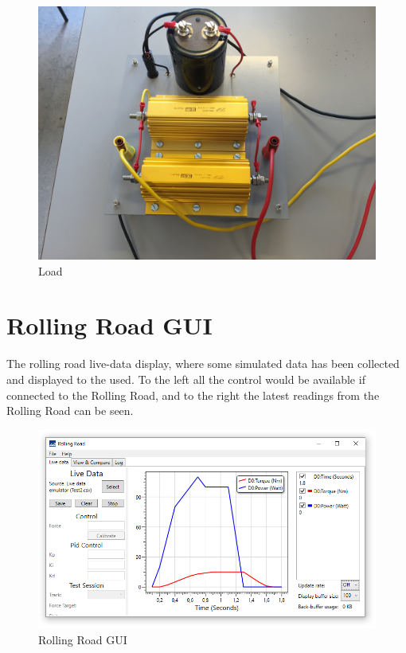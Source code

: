 \begin{figure}[H]
	\centering
	\includegraphics[width=0.7\linewidth]{SubPages/Images/SD_RR_Load}
	\caption{Load}
	\label{fig:SD_RR_Load}
\end{figure}


\section{Rolling Road GUI}

The rolling road live-data display, where some simulated data has been collected and displayed to the used. To the left all the control would be available if connected to the Rolling Road, and to the right the latest readings from the Rolling Road can be seen.

\begin{figure}[H]
	\centering
	\includegraphics[width=0.9\linewidth]{SubPages/Images/SD_GUI}
	\caption{Rolling Road GUI}
	\label{fig:SD_GUI}
\end{figure}
